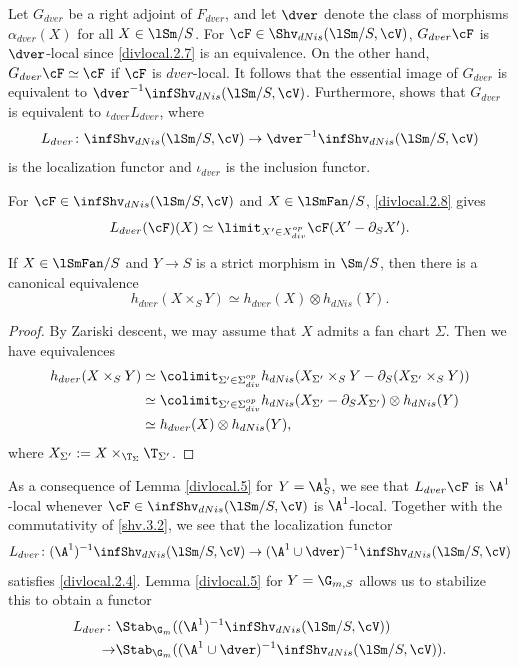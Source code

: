 \documentclass[10pt]{amsart}
\begin{document}
\begin{const}
Let $G_{dver}$ be a right adjoint of $F_{dver}$, and let $\dver$ denote the class of morphisms $\alpha_{dver}(X)$ for all $X\in \lSm/S$.
For $\cF\in \Shv_{dNis}(\lSm/S,\cV)$, $G_{dver}\cF$ is $\dver$-local since \eqref{divlocal.2.7} is an equivalence.
On the other hand, $G_{dver}\cF\simeq \cF$ if $\cF$ is $dver$-local.
It follows that the essential image of $G_{dver}$ is equivalent to $\dver^{-1}\infShv_{dNis}(\lSm/S,\cV)$.
Furthermore, \cite[Proposition 5.2.7.4]{HTT} shows that $G_{dver}$ is equivalent to $\iota_{dver}L_{dver}$, where
\[
L_{dver}\colon \infShv_{dNis}(\lSm/S,\cV) \to \dver^{-1}\infShv_{dNis}(\lSm/S,\cV)
\]
is the localization functor and $\iota_{dver}$ is the inclusion functor.

For $\cF\in \infShv_{dNis}(\lSm/S,\cV)$ and $X\in \lSmFan/S$, \eqref{divlocal.2.8} gives
\begin{equation}
\label{divlocal.2.4}
L_{dver}(\cF)(X)
\simeq
\limit_{X'\in X_{div}^{op}}\cF(X'-\partial_S X').
\end{equation}
\end{const}

\begin{lem}
\label{divlocal.5}
If $X\in \lSmFan/S$ and $Y\to S$ is a strict morphism in $\Sm/S$, then there is a canonical equivalence
\[
h_{dver}(X\times_S Y)
\simeq
h_{dver}(X)\otimes h_{dNis}(Y).
\]
\end{lem}
\begin{proof}
By Zariski descent, we may assume that $X$ admits a fan chart $\Sigma$.
Then we have equivalences
\begin{align*}
h_{dver}(X\times_S Y)
&\simeq
\colimit_{\Sigma'\in \Sigma_{div}^{op}}
h_{dNis}(X_{\Sigma'}\times_S Y-\partial_S (X_{\Sigma'}\times_S Y))
\\
&\simeq
\colimit_{\Sigma'\in \Sigma_{div}^{op}}
h_{dNis}(X_{\Sigma'}-\partial_S X_{\Sigma'}) \otimes h_{dNis}(Y)
\\
& \simeq
h_{dver}(X)\otimes h_{dNis}(Y),
\end{align*}
where $X_{\Sigma'}:=X\times_{\T_\Sigma}\T_{\Sigma'}$.
\end{proof}

As a consequence of Lemma \ref{divlocal.5} for $Y=\A_S^1$, we see that $L_{dver}\cF$ is $\A^1$-local whenever $\cF\in \infShv_{dNis}(\lSm/S,\cV)$ is $\A^1$-local.
Together with the commutativity of \eqref{shv.3.2}, we see that the localization functor
\[
L_{dver}
\colon
(\A^1)^{-1}\infShv_{dNis}(\lSm/S,\cV)
\to
(\A^1\cup \dver)^{-1}\infShv_{dNis}(\lSm/S,\cV)
\]
satisfies \eqref{divlocal.2.4}.
Lemma \ref{divlocal.5} for $Y=\G_{m,S}$ allows us to stabilize this to obtain a functor
\begin{align*}
L_{dver}
\colon
 & \Stab_{\G_m}((\A^1)^{-1}\infShv_{dNis}(\lSm/S,\cV))
\\
\to &
\Stab_{\G_m}((\A^1\cup \dver)^{-1}\infShv_{dNis}(\lSm/S,\cV)).
\end{align*}
\end{document}
